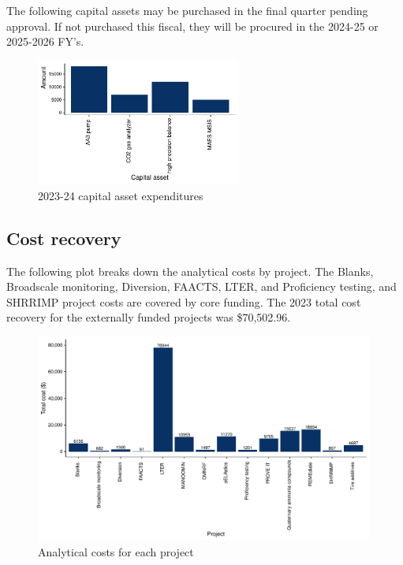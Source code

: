 \documentclass[
]{article}
\begin{document}
The following capital assets may be purchased in the final quarter
pending approval. If not purchased this fiscal, they will be procured in
the 2024-25 or 2025-2026 FY's.

\begin{figure}[h]
\centering
  \includegraphics[width=0.6\textwidth]{2023_24FY_capital_assets.pdf}
  \caption{2023-24 capital asset expenditures}
\end{figure}
\pagebreak

\hypertarget{cost-recovery}{%
\subsection{Cost recovery}\label{cost-recovery}}

The following plot breaks down the analytical costs by project. The
Blanks, Broadscale monitoring, Diversion, FAACTS, LTER, and Proficiency
testing, and SHRRIMP project costs are covered by core funding. The 2023
total cost recovery for the externally funded projects was \$70,502.96.

\begin{figure}[h]
\centering
  \includegraphics[width=0.99\textwidth]{costs_summary_plot.pdf}
  \caption{Analytical costs for each project}
\end{figure}
\end{document}
